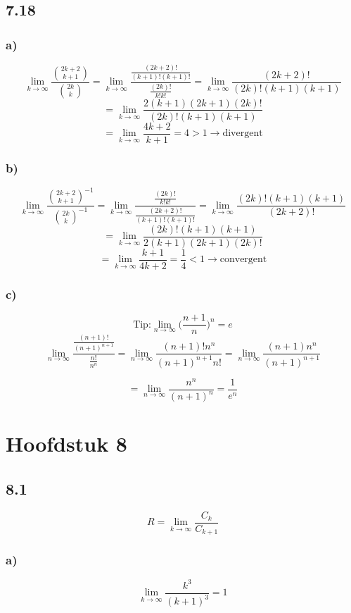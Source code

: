 \documentclass[11pt]{article}
\begin{document}
\subsection*{7.18}
\subsubsection*{a)}

\[
\lim_{k\rightarrow\infty}\frac{\binom{2k+2}{k+1}}{\binom{2k}{k}}
=
\lim_{k\rightarrow\infty}\frac{\frac{(2k+2)!}{(k+1)!(k+1)!}}{\frac{(2k)!}{k!k!}}
= 
\lim_{k\rightarrow\infty}\frac{(2k+2)!}{(2k)!(k+1)(k+1)}
\]
$$ = \lim_{k\rightarrow\infty}\frac{2(k+1)(2k+1)(2k)!}{(2k)!(k+1)(k+1)}$$
$$ = \lim_{k\rightarrow\infty}\frac{4k + 2}{k + 1} = 4 > 1 \rightarrow \text{divergent}$$

\subsubsection*{b)}
\[
\lim_{k\rightarrow\infty}\frac{\binom{2k+2}{k+1}^{-1}}{\binom{2k}{k}^{-1}}
=
\lim_{k\rightarrow\infty}\frac{\frac{(2k)!}{k!k!}}{\frac{(2k+2)!}{(k+1)!(k+1)!}}
=
\lim_{k\rightarrow\infty}\frac{(2k)!(k+1)(k+1)}{(2k+2)!}
\]
$$= \lim_{k\rightarrow\infty}\frac{(2k)!(k+1)(k+1)}{2(k+1)(2k+1)(2k)!}$$
$$ = \lim_{k\rightarrow\infty}\frac{k + 1}{4k + 2} = \frac{1}{4} < 1 \rightarrow \text{convergent}$$
\subsubsection*{c)}
$$\text{Tip:} \lim_{n\rightarrow\infty}\Big(\frac{n+1}{n}\Big)^n = e $$
\[
\lim_{n\rightarrow\infty}\frac{\frac{(n+1)!}{(n+1)^{n+1}}}{\frac{n!}{n^n}}
=
\lim_{n\rightarrow\infty}\frac{(n+1)!n ^n}{(n+1) ^{n+1} n!}
=
\lim_{n\rightarrow\infty}\frac{(n+1)n ^n}{(n+1)^{n+1}}
\]

$$=\lim_{n\rightarrow\infty}\frac{n^n}{(n+1)^n} = \frac{1}{e^n}$$


\section*{Hoofdstuk 8}
\subsection*{8.1}
\[
R = \lim_{k\rightarrow\infty}\frac{C_k}{C_{k+1}}
\]

\subsubsection*{a)}
\[
\lim_{k\rightarrow\infty}\frac{k^3}{(k+1)^3} = 1
\]
\end{document}
